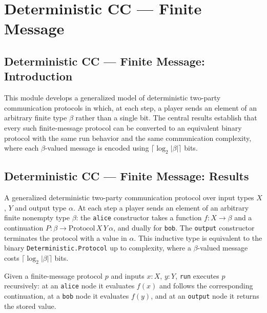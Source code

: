 \section{Deterministic CC --- Finite Message}
\subsection*{Deterministic CC --- Finite Message: Introduction}

This module develops a generalized model of deterministic two-party communication protocols in
which, at each step, a player sends an element of an arbitrary finite type $\beta$ rather than
a single bit.  The central results establish that every such finite-message protocol can be
converted to an equivalent binary protocol with the same run behavior and the same communication
complexity, where each $\beta$-valued message is encoded using $\lceil \log_2 |\beta| \rceil$
bits.

\subsection*{Deterministic CC --- Finite Message: Results}

\begin{definition}
\label{CommunicationComplexity.Deterministic.FiniteMessage.Protocol}
\leanok
A generalized deterministic two-party communication protocol over input types $X$, $Y$ and
output type $\alpha$.  At each step a player sends an element of an arbitrary finite nonempty
type $\beta$: the \texttt{alice} constructor takes a function $f : X \to \beta$ and a
continuation $P : \beta \to \mathrm{Protocol}\,X\,Y\,\alpha$, and dually for \texttt{bob}.
The \texttt{output} constructor terminates the protocol with a value in $\alpha$.  This
inductive type is equivalent to the binary \texttt{Deterministic.Protocol} up to complexity,
where a $\beta$-valued message costs $\lceil \log_2 |\beta| \rceil$ bits.
\end{definition}

\begin{definition}
\label{CommunicationComplexity.Deterministic.FiniteMessage.Protocol.run}
\leanok
{}
Given a finite-message protocol $p$ and inputs $x : X$, $y : Y$, \texttt{run} executes $p$
recursively: at an \texttt{alice} node it evaluates $f(x)$ and follows the corresponding
continuation, at a \texttt{bob} node it evaluates $f(y)$, and at an \texttt{output} node it
returns the stored value.
\end{definition}

